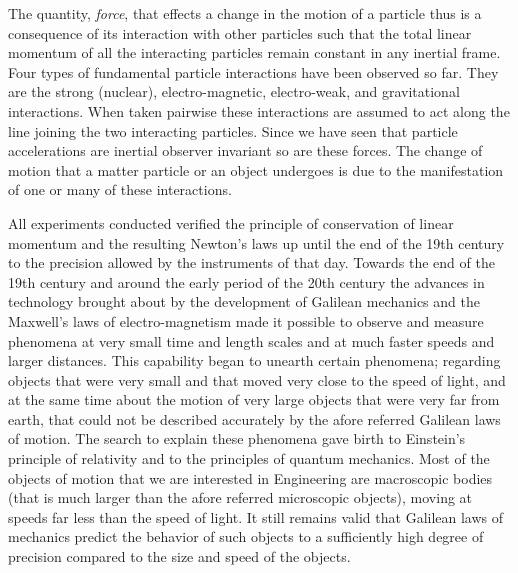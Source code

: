 \documentclass[graybox,envcountchap,sectrefs]{svmonoMuga}
\begin{document}
The quantity, \textit{force}, that effects a change in the motion of a particle thus is a consequence of its interaction with other particles such that the total linear momentum of all the interacting particles remain constant in any inertial frame. Four types of fundamental particle interactions have been observed so far. They are the strong 
(nuclear), electro-magnetic, electro-weak, and gravitational interactions. When taken pairwise these interactions are assumed to act along the line joining the two interacting particles. Since we have seen that particle accelerations are inertial observer invariant so are these forces. The change of motion that a matter particle or an object undergoes is due to the manifestation of one or many of these interactions.


All experiments conducted verified the principle of conservation of linear momentum and the resulting Newton's laws up until the end of the 19th century to the precision allowed by the instruments of that day.  Towards the end of the 19th century and around the early period of the 20th century the advances in technology brought about by the development of Galilean mechanics and the Maxwell's laws of electro-magnetism made it possible to observe and measure phenomena at very small time and length scales and at much faster speeds and larger distances. This capability began to unearth certain phenomena; regarding objects that were very small and that moved very close to the speed of light, and at the same time about the motion of very large objects that were very far from earth, that could not be described accurately by the afore referred Galilean laws of motion. The search to explain these phenomena gave birth to Einstein's principle of relativity and to the principles of quantum mechanics. Most of the objects of motion that we are interested in Engineering are macroscopic bodies (that is much larger than the afore referred microscopic objects), moving at speeds far less than the speed of light. It still remains valid that Galilean laws of mechanics predict the behavior of such objects to a sufficiently high degree of precision compared to the size and speed of the objects.
 
\end{document}
